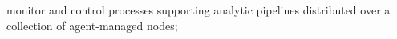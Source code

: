 \begin{description}
  \item monitor and control processes supporting analytic pipelines distributed over a collection of agent-managed nodes;
\end{description}